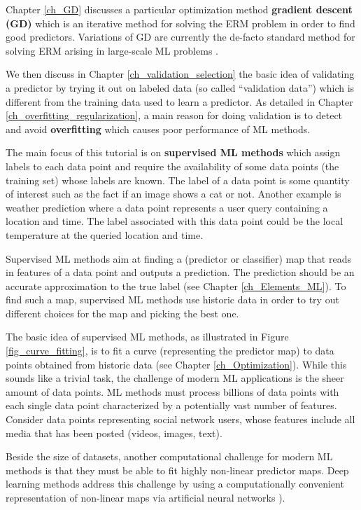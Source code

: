 \documentclass[12pt]{report}
\begin{document}
Chapter \ref{ch_GD} discusses a particular optimization method 
{\bf gradient descent (GD)} which is an iterative method for solving 
the ERM problem in order to find good predictors. Variations of GD 
are currently the de-facto standard method for solving ERM arising 
in large-scale ML problems \cite{Goodfellow-et-al-2016}. 

We then discuss in Chapter \ref{ch_validation_selection} the basic 
idea of validating a predictor by trying it out on labeled data (so called 
``validation data'') which is different from the training data used 
to learn a predictor. As detailed in Chapter \ref{ch_overfitting_regularization}, 
a main reason for doing validation is to detect and avoid {\bf overfitting} 
which causes poor performance of ML methods. 

The main focus of this tutorial is on {\bf supervised ML methods} which 
assign labels to each data point and require the availability of some data 
points (the training set) whose labels are known. The label of a data point 
is some quantity of interest such as the fact if an image shows a cat or not. 
Another example is weather prediction where a data point represents a 
user query containing a location and time. The label associated with this 
data point could be the local temperature at the queried location 
and time. 

Supervised ML methods aim at finding a (predictor or classifier) map 
that reads in features of a data point and outputs a prediction. The 
prediction should be an accurate approximation to the true label 
(see Chapter \ref{ch_Elements_ML}). To find such a map, supervised 
ML methods use historic data in order to try out different choices for 
the map and picking the best one. 

The basic idea of supervised ML methods, as illustrated in 
Figure \ref{fig_curve_fitting}, is to fit a curve (representing 
the predictor map) to data points obtained from historic data 
(see Chapter \ref{ch_Optimization}). While this sounds like a 
trivial task, the challenge of modern ML applications is the sheer 
amount of data points. ML methods must process billions of 
data points with each single data point characterized by a potentially 
vast number of features. Consider data points representing 
social network users, whose features include all media that 
has been posted (videos, images, text). 

Beside the size of datasets, another computational challenge for modern ML methods is that they must be 
able to fit highly non-linear predictor maps. Deep learning methods address this challenge by using a 
computationally convenient representation of non-linear maps via artificial neural networks \cite{Goodfellow-et-al-2016}). 
\end{document}
